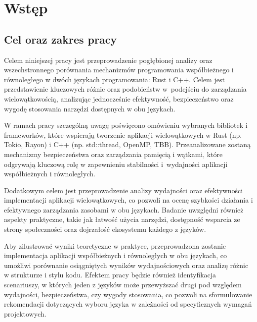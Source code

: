 \chapter[Wstęp]{Wstęp}
\section{Cel oraz zakres pracy}
Celem niniejszej pracy jest przeprowadzenie pogłębionej analizy oraz wszechstronnego porównania mechanizmów programowania współbieżnego i równoległego w dwóch językach programowania: Rust i C++. Celem jest przedstawienie kluczowych różnic oraz podobieństw w~podejściu do zarządzania wielowątkowością, analizując jednocześnie efektywność, bezpieczeństwo oraz wygodę stosowania narzędzi dostępnych w obu językach.

W ramach pracy szczególną uwagę poświęcono omówieniu wybranych bibliotek i frameworków, które wspierają tworzenie aplikacji wielowątkowych w Rust (np. Tokio, Rayon) i C++ (np. std::thread, OpenMP, TBB). Przeanalizowane zostaną mechanizmy bezpieczeństwa oraz zarządzania pamięcią i wątkami, które odgrywają kluczową rolę w zapewnieniu stabilności i~wydajności aplikacji współbieżnych i równoległych.

Dodatkowym celem jest przeprowadzenie analizy wydajności oraz efektywności implementacji aplikacji wielowątkowych, co pozwoli na ocenę szybkości działania i efektywnego zarządzania zasobami w obu językach. Badanie uwzględni również aspekty praktyczne, takie jak łatwość użycia narzędzi, dostępność wsparcia ze strony społeczności oraz dojrzałość ekosystemu każdego z języków.

Aby zilustrować wyniki teoretyczne w praktyce, przeprowadzona zostanie implementacja aplikacji współbieżnych i równoległych w obu językach, co umożliwi porównanie osiągniętych wyników wydajnościowych oraz analizę różnic w strukturze i stylu kodu. Efektem pracy będzie również identyfikacja scenariuszy, w których jeden z języków może przewyższać drugi pod względem wydajności, bezpieczeństwa, czy wygody stosowania, co pozwoli na sformułowanie rekomendacji dotyczących wyboru języka w zależności od specyficznych wymagań projektowych.

